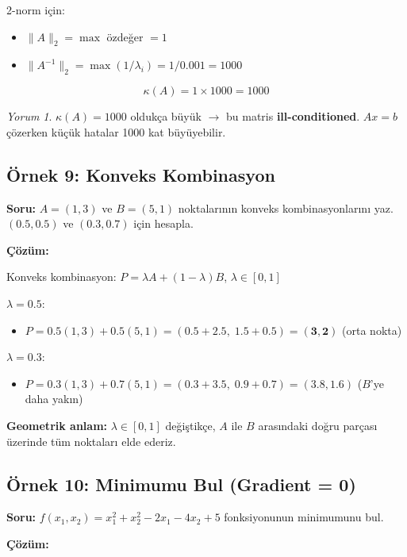 \documentclass[12pt,a4paper]{article}
\theoremstyle{definition}
\theoremstyle{remark}
\newtheorem*{yorum}{Yorum}
\begin{document}
2-norm i\c{c}in:
\begin{itemize}
    \item $\|A\|_2 = \max$ \"ozde\u{g}er $= 1$
    \item $\|A^{-1}\|_2 = \max(1/\lambda_i) = 1/0.001 = 1000$
\end{itemize}

\[
\kappa(A) = 1 \times 1000 = 1000
\]

\begin{yorum}
$\kappa(A) = 1000$ olduk\c{c}a b\"uy\"uk $\to$ bu matris \textbf{ill-conditioned}. $Ax = b$ \c{c}\"ozerken k\"u\c{c}\"uk hatalar 1000 kat b\"uy\"uyebilir.
\end{yorum}

\subsection{\"Ornek 9: Konveks Kombinasyon}

\textbf{Soru:} $A = (1, 3)$ ve $B = (5, 1)$ noktalar{\i}n{\i}n konveks kombinasyonlar{\i}n{\i} yaz. $(0.5, 0.5)$ ve $(0.3, 0.7)$ i\c{c}in hesapla.

\textbf{\c{C}\"oz\"um:}

Konveks kombinasyon: $P = \lambda A + (1-\lambda)B$, $\lambda \in [0,1]$

$\lambda = 0.5$:
\begin{itemize}
    \item $P = 0.5(1,3) + 0.5(5,1) = (0.5+2.5,\; 1.5+0.5) = \mathbf{(3, 2)}$ (orta nokta)
\end{itemize}

$\lambda = 0.3$:
\begin{itemize}
    \item $P = 0.3(1,3) + 0.7(5,1) = (0.3+3.5,\; 0.9+0.7) = \mathbf{(3.8, 1.6)}$ ($B$'ye daha yak{\i}n)
\end{itemize}

\textbf{Geometrik anlam:} $\lambda \in [0,1]$ de\u{g}i\c{s}tik\c{c}e, $A$ ile $B$ aras{\i}ndaki do\u{g}ru par\c{c}as{\i} \"uzerinde t\"um noktalar{\i} elde ederiz.

\subsection{\"Ornek 10: Minimumu Bul (Gradient = 0)}

\textbf{Soru:} $f(x_1, x_2) = x_1^2 + x_2^2 - 2x_1 - 4x_2 + 5$ fonksiyonunun minimumunu bul.

\textbf{\c{C}\"oz\"um:}
\end{document}

